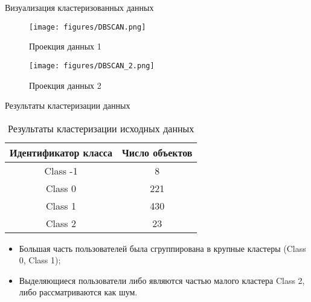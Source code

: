 \documentclass{beamer}
\begin{document}
\begin{frame}{Визуализация кластеризованных данных}
    
    \begin{minipage}[b]{0.45\linewidth}
        \centering
        \begin{figure}
            \texttt{[image: figures/DBSCAN.png]}
            \caption{\scriptsize Проекция данных 1}
            \label{fig:f_s_tag}
        \end{figure}
    \end{minipage}
    \begin{minipage}[b]{0.45\linewidth}
        \centering
        \begin{figure}
            \texttt{[image: figures/DBSCAN\_2.png]}
            \caption{\scriptsize Проекция данных 2}
            \label{fig:f_s_tag}            
        \end{figure}
    \end{minipage}
\end{frame}

\begin{frame}{Результаты кластеризации данных}

    \begin{table}
        \begin{tabular}{| c | c |}
            \hline
            Идентификатор класса & Число объектов \\
            \hline
            Class -1 & 8 \\
            \hline
            Class 0 & 221 \\
            \hline
            Class 1 & 430 \\
            \hline
            Class 2 & 23\\
            \hline
        \end{tabular}
        \caption{Результаты кластеризации исходных данных}
    \end{table}
    \begin{itemize}
        \item Большая часть пользователей была сгруппирована в крупные кластеры (Class 0, Class 1);
        \item Выделяющиеся пользователи либо являются частью малого кластера Class 2, либо рассматриваются как шум.
    \end{itemize}{}
\end{frame}
\end{document}
